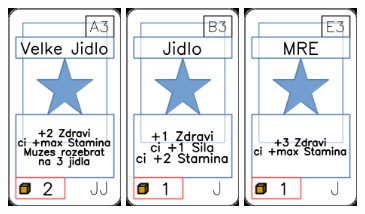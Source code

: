 \documentclass[a4paper]{article}
\begin{document}
	\includegraphics[width=3.0cm]{img-1_32}
	\includegraphics[width=3.0cm]{img-1_7}
	\includegraphics[width=3.0cm]{img-1_22}
\end{document}

